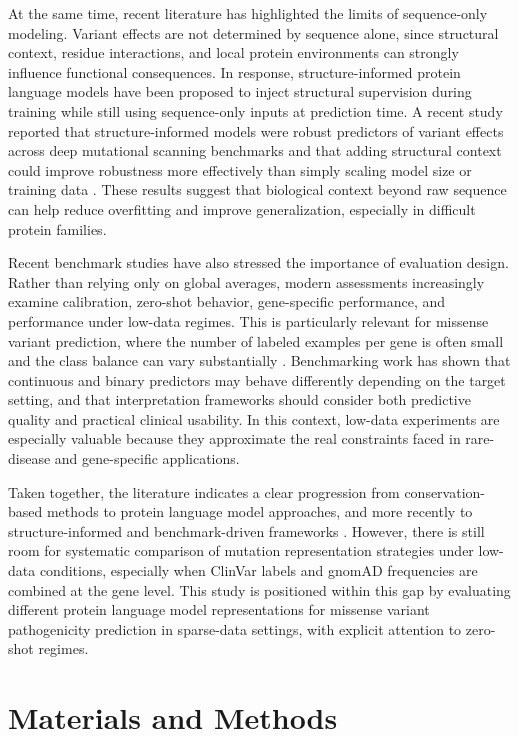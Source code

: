 \documentclass[12pt]{article}
\begin{document}
At the same time, recent literature has highlighted the limits of sequence-only modeling. Variant effects are not determined by sequence alone, since structural context, residue interactions, and local protein environments can strongly influence functional consequences. In response, structure-informed protein language models have been proposed to inject structural supervision during training while still using sequence-only inputs at prediction time. A recent study reported that structure-informed models were robust predictors of variant effects across deep mutational scanning benchmarks and that adding structural context could improve robustness more effectively than simply scaling model size or training data \cite{sun}. These results suggest that biological context beyond raw sequence can help reduce overfitting and improve generalization, especially in difficult protein families.

Recent benchmark studies have also stressed the importance of evaluation design. Rather than relying only on global averages, modern assessments increasingly examine calibration, zero-shot behavior, gene-specific performance, and performance under low-data regimes. This is particularly relevant for missense variant prediction, where the number of labeled examples per gene is often small and the class balance can vary substantially \cite{vasquez}. Benchmarking work has shown that continuous and binary predictors may behave differently depending on the target setting, and that interpretation frameworks should consider both predictive quality and practical clinical usability. In this context, low-data experiments are especially valuable because they approximate the real constraints faced in rare-disease and gene-specific applications.

Taken together, the literature indicates a clear progression from conservation-based methods to protein language model approaches, and more recently to structure-informed and benchmark-driven frameworks \cite{sun}. However, there is still room for systematic comparison of mutation representation strategies under low-data conditions, especially when ClinVar labels and gnomAD frequencies are combined at the gene level. This study is positioned within this gap by evaluating different protein language model representations for missense variant pathogenicity prediction in sparse-data settings, with explicit attention to zero-shot regimes.

\section{Materials and Methods}
\end{document}
